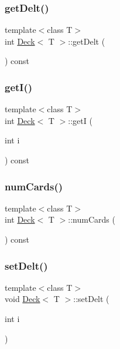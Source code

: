 \subsubsection{\texorpdfstring{get\+Delt()}{getDelt()}}
{\footnotesize\ttfamily template$<$class T$>$ \\
int \mbox{\hyperlink{class_deck}{Deck}}$<$ T $>$\+::get\+Delt (\begin{DoxyParamCaption}{ }\end{DoxyParamCaption}) const\hspace{0.3cm}{\ttfamily [inline]}}

\mbox{\label{class_deck_ae14e1d90f79f0feab99036164559cdd9}} 
\subsubsection{\texorpdfstring{get\+I()}{getI()}}
{\footnotesize\ttfamily template$<$class T$>$ \\
int \mbox{\hyperlink{class_deck}{Deck}}$<$ T $>$\+::getI (\begin{DoxyParamCaption}\item[{int}]{i }\end{DoxyParamCaption}) const\hspace{0.3cm}{\ttfamily [inline]}}

\mbox{\label{class_deck_add2b30cd032ad01e7397ec0dc333419a}} 
\subsubsection{\texorpdfstring{num\+Cards()}{numCards()}}
{\footnotesize\ttfamily template$<$class T$>$ \\
int \mbox{\hyperlink{class_deck}{Deck}}$<$ T $>$\+::num\+Cards (\begin{DoxyParamCaption}{ }\end{DoxyParamCaption}) const\hspace{0.3cm}{\ttfamily [inline]}}

\mbox{\label{class_deck_ad0aa6682496d7d68ea1799e2e0b596db}} 
\subsubsection{\texorpdfstring{set\+Delt()}{setDelt()}}
{\footnotesize\ttfamily template$<$class T$>$ \\
void \mbox{\hyperlink{class_deck}{Deck}}$<$ T $>$\+::set\+Delt (\begin{DoxyParamCaption}\item[{int}]{i }\end{DoxyParamCaption})\hspace{0.3cm}{\ttfamily [inline]}}

